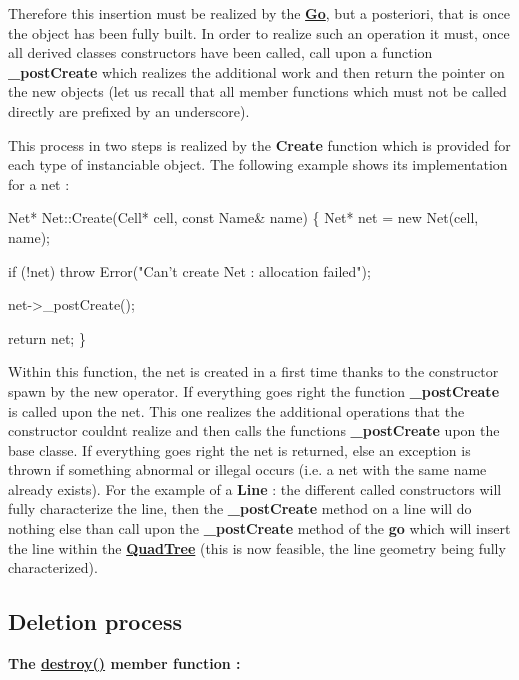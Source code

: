 Therefore this insertion must be realized by the {\bfseries \mbox{\hyperlink{classHurricane_1_1Go}{Go}}}, but a posteriori, that is once the object has been fully built. In order to realize such an operation it must, once all derived classes constructors have been called, call upon a function {\bfseries \+\_\+post\+Create} which realizes the additional work and then return the pointer on the new objects (let us recall that all member functions which must not be called directly are prefixed by an underscore).

This process in two steps is realized by the {\bfseries Create} function which is provided for each type of instanciable object. The following example shows its implementation for a net \+: 
\begin{DoxyCode}
Net* Net::Create(Cell* cell, \textcolor{keyword}{const} Name& name)
\{
   Net* net = \textcolor{keyword}{new} Net(cell, name);
 
   \textcolor{keywordflow}{if} (!net)
      \textcolor{keywordflow}{throw} Error(\textcolor{stringliteral}{"Can't create Net : allocation failed"});
 
   net->\_postCreate();
 
   \textcolor{keywordflow}{return} net;
\}
\end{DoxyCode}


Within this function, the net is created in a first time thanks to the constructor spawn by the new operator. If everything goes right the function {\bfseries \+\_\+post\+Create} is called upon the net. This one realizes the additional operations that the constructor couldn\textquotesingle{}t realize and then calls the functions {\bfseries \+\_\+post\+Create} upon the base classe. If everything goes right the net is returned, else an exception is thrown if something abnormal or illegal occurs (i.\+e. a net with the same name already exists). For the example of a {\bfseries Line} \+: the different called constructors will fully characterize the line, then the {\bfseries \+\_\+post\+Create} method on a line will do nothing else than call upon the {\bfseries \+\_\+post\+Create} method of the {\bfseries go} which will insert the line within the {\bfseries \mbox{\hyperlink{classHurricane_1_1QuadTree}{Quad\+Tree}}} (this is now feasible, the line geometry being fully characterized).\hypertarget{classHurricane_1_1DBo_sDBodestroy}{}\subsection{Deletion process}\label{classHurricane_1_1DBo_sDBodestroy}
{\bfseries The \mbox{\hyperlink{classHurricane_1_1DBo_a67febf5bf9c8b322674648688639728b}{destroy()}} member function \+:}


